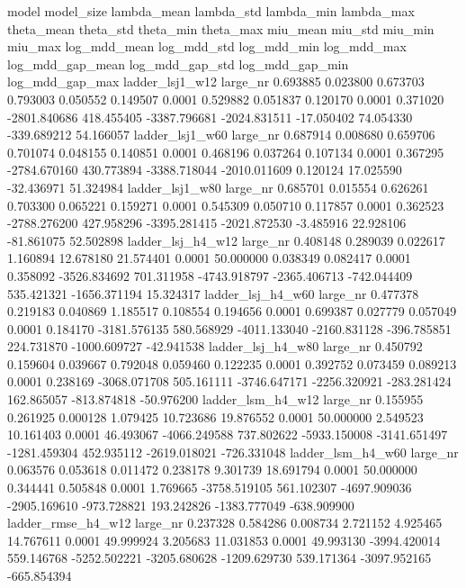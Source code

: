               model model_size  lambda_mean  lambda_std  lambda_min  lambda_max  theta_mean  theta_std  theta_min  theta_max  miu_mean   miu_std  miu_min   miu_max  log_mdd_mean  log_mdd_std  log_mdd_min  log_mdd_max  log_mdd_gap_mean  log_mdd_gap_std  log_mdd_gap_min  log_mdd_gap_max
    ladder_lsj1_w12   large_nr     0.693885    0.023800    0.673703    0.793003    0.050552   0.149507     0.0001   0.529882  0.051837  0.120170   0.0001  0.371020  -2801.840686   418.455405 -3387.796681 -2024.831511        -17.050402        74.054330      -339.689212        54.166057
    ladder_lsj1_w60   large_nr     0.687914    0.008680    0.659706    0.701074    0.048155   0.140851     0.0001   0.468196  0.037264  0.107134   0.0001  0.367295  -2784.670160   430.773894 -3388.718044 -2010.011609          0.120124        17.025590       -32.436971        51.324984
    ladder_lsj1_w80   large_nr     0.685701    0.015554    0.626261    0.703300    0.065221   0.159271     0.0001   0.545309  0.050710  0.117857   0.0001  0.362523  -2788.276200   427.958296 -3395.281415 -2021.872530         -3.485916        22.928106       -81.861075        52.502898
  ladder_lsj_h4_w12   large_nr     0.408148    0.289039    0.022617    1.160894   12.678180  21.574401     0.0001  50.000000  0.038349  0.082417   0.0001  0.358092  -3526.834692   701.311958 -4743.918797 -2365.406713       -742.044409       535.421321     -1656.371194        15.324317
  ladder_lsj_h4_w60   large_nr     0.477378    0.219183    0.040869    1.185517    0.108554   0.194656     0.0001   0.699387  0.027779  0.057049   0.0001  0.184170  -3181.576135   580.568929 -4011.133040 -2160.831128       -396.785851       224.731870     -1000.609727       -42.941538
  ladder_lsj_h4_w80   large_nr     0.450792    0.159604    0.039667    0.792048    0.059460   0.122235     0.0001   0.392752  0.073459  0.089213   0.0001  0.238169  -3068.071708   505.161111 -3746.647171 -2256.320921       -283.281424       162.865057      -813.874818       -50.976200
  ladder_lsm_h4_w12   large_nr     0.155955    0.261925    0.000128    1.079425   10.723686  19.876552     0.0001  50.000000  2.549523 10.161403   0.0001 46.493067  -4066.249588   737.802622 -5933.150008 -3141.651497      -1281.459304       452.935112     -2619.018021      -726.331048
  ladder_lsm_h4_w60   large_nr     0.063576    0.053618    0.011472    0.238178    9.301739  18.691794     0.0001  50.000000  0.344441  0.505848   0.0001  1.769665  -3758.519105   561.102307 -4697.909036 -2905.169610       -973.728821       193.242826     -1383.777049      -638.909900
 ladder_rmse_h4_w12   large_nr     0.237328    0.584286    0.008734    2.721152    4.925465  14.767611     0.0001  49.999924  3.205683 11.031853   0.0001 49.993130  -3994.420014   559.146768 -5252.502221 -3205.680628      -1209.629730       539.171364     -3097.952165      -665.854394
